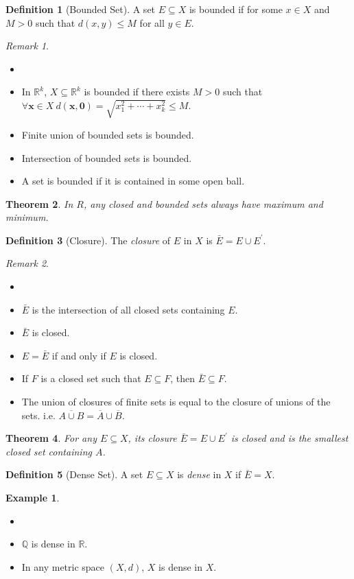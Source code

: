 \documentclass[12pt, lettersize]{article}
\theoremstyle{plain}
\newtheorem{thm}{Theorem}[section]
\theoremstyle{definition}
\newtheorem{dfn}[thm]{Definition}
\newtheorem*{eg}{Example}
\theoremstyle{remark}
\newtheorem*{rem}{Remark}
\newcommand{\R}{\mathbb{R}}
\newcommand{\Q}{\mathbb{Q}}
\begin{document}
\begin{dfn}[Bounded Set]
	A set $E\subseteq X$ is bounded if for some $x\in X$ and $M>0$ such that $d(x,y)\leq M$ for all $y\in E$.
\end{dfn}
\begin{rem}
	\begin{itemize}
		\item[]
		\item In $\R^k$, $X\subseteq\R^k$ is bounded if there exists $M>0$ such that $\forall\mathbf{x}\in X\ d(\mathbf{x},\mathbf{0})=\sqrt{x_1^2+\cdots+x_k^2}\leq M$.
		\item Finite union of bounded sets is bounded.
		\item Intersection of bounded sets is bounded.
		\item A set is bounded if it is contained in some open ball.
	\end{itemize}
\end{rem}

\begin{thm}
	In $R$, any closed and bounded sets always have maximum and minimum.
\end{thm}

\begin{dfn}[Closure]
	The \emph{closure} of $E$ in $X$ is $\bar{E}=E\cup E^\prime$.
\end{dfn}
\begin{rem}
	\begin{itemize}
		\item[]
		\item $\bar{E}$ is the intersection of all closed sets containing $E$.
		\item $\bar{E}$ is closed.
		\item $E=\bar{E}$ if and only if $E$ is closed.
		\item If $F$ is a closed set such that $E\subseteq F$, then $\bar{E}\subseteq F$.
		\item The union of closures of finite sets is equal to the closure of unions of the sets. i.e. $\overline{A\cup B}=\overline{A}\cup\overline{B}$.
	\end{itemize}
\end{rem}

\begin{thm}
	For any $E\subseteq X$, its closure $\bar{E}=E\cup E^\prime$ is closed and is the smallest closed set containing $A$.
\end{thm}

\begin{dfn}[Dense Set]
	A set $E\subseteq X$ is \emph{dense} in $X$ if $\bar{E}=X$.
\end{dfn}
\begin{eg}
	\begin{itemize}
		\item[]
		\item $\Q$ is dense in $\R$.
		\item In any metric space $(X,d)$, $X$ is dense in $X$. 
	\end{itemize}
\end{eg}
\end{document}
